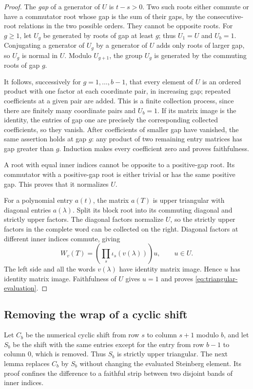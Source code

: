 \begin{proof}
The \emph{gap} of a generator of $U$ is $t-s>0$.
Two such roots either commute or have a commutator root whose
gap is the sum of their gaps, by the consecutive-root relations
in the two possible orders.  They cannot be opposite roots.
For $g\geq1$, let $U_g$ be generated by roots of gap at least $g$;
thus $U_1=U$ and $U_b=1$.  Conjugating a generator of $U_g$ by
a generator of $U$ adds only roots of larger gap, so $U_g$ is
normal in $U$.  Modulo $U_{g+1}$, the group $U_g$ is generated
by the commuting roots of gap $g$.

It follows, successively for $g=1,\ldots,b-1$, that every element
of $U$ is an ordered product with one factor at each coordinate
pair, in increasing gap; repeated coefficients at a given pair
are added.  This is a finite collection process, since there are
finitely many coordinate pairs and $U_b=1$.
If its matrix image is the identity, the entries of gap one
are precisely the corresponding collected coefficients, so they
vanish.  After coefficients of smaller gap have vanished, the
same assertion holds at gap $g$: any product of two remaining
entry matrices has gap greater than $g$.  Induction makes every
coefficient zero and proves faithfulness.

A root with equal inner indices cannot be opposite to a
positive-gap root.  Its commutator with a positive-gap root is
either trivial or has the same positive gap.  This proves that
it normalizes $U$.

For a polynomial entry $a(t)$, the matrix $a(T)$ is upper
triangular with diagonal entries $a(\lambda)$.  Split its block
root into its commuting diagonal and strictly upper factors.
The diagonal factors normalize $U$, so the strictly upper
factors in the complete word can be collected on the right.
Diagonal factors at different inner indices commute, giving
\[
 W_v(T)=\left(\prod_s\iota_s(v(\lambda))\right)u,
 \qquad u\in U.
\]
The left side and all the words $v(\lambda)$ have identity
matrix image.  Hence $u$ has identity matrix image.  Faithfulness
of $U$ gives $u=1$ and proves \eqref{eq:triangular-evaluation}.
\end{proof}

\subsection{Removing the wrap of a cyclic shift}

Let $C_b$ be the numerical cyclic shift from row $s$ to column
$s+1$ modulo $b$, and let $S_b$ be the shift with the same entries
except for the entry from row $b-1$ to column $0$, which is removed.
Thus $S_b$ is strictly upper triangular.  The next lemma replaces
$C_b$ by $S_b$ without changing the evaluated Steinberg element.
Its proof confines the difference to a faithful strip between
two disjoint bands of inner indices.

